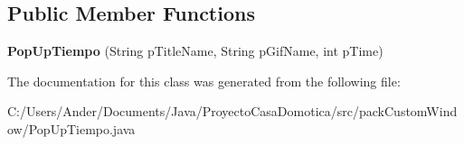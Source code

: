 \subsection*{Public Member Functions}
\begin{DoxyCompactItemize}
\item 
\mbox{\label{classpack_custom_window_1_1_pop_up_tiempo_a7cc512d6d1807b3c1ad1eb3e1e6c9eac}} 
{\bfseries Pop\+Up\+Tiempo} (String p\+Title\+Name, String p\+Gif\+Name, int p\+Time)
\end{DoxyCompactItemize}


The documentation for this class was generated from the following file\+:\begin{DoxyCompactItemize}
\item 
C\+:/\+Users/\+Ander/\+Documents/\+Java/\+Proyecto\+Casa\+Domotica/src/pack\+Custom\+Window/Pop\+Up\+Tiempo.\+java\end{DoxyCompactItemize}
